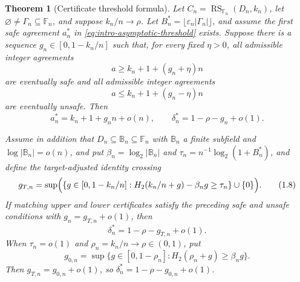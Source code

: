 \documentclass[11pt,a4paper]{amsart}
\numberwithin{equation}{section}
\newtheorem{theorem}{Theorem}[section]
\theoremstyle{remark}
\DeclareMathOperator{\RS}{RS}
\newcommand{\F}{\mathbb F}
\newcommand{\B}{\mathbb B}
\newcommand{\eps}{\varepsilon}
\begin{document}
\begin{theorem}[Certificate threshold formula]\label{thm:intro-delta-formula}
Let \(C_n=\RS_{\F_n}(D_n,k_n)\), let
\(\varnothing\ne\Gamma_n\subseteq\F_n\), and suppose \(k_n/n\to\rho\).
Let \(B_n^*=\lfloor\eps_n|\Gamma_n|\rfloor\), and assume the first safe
agreement \(a_n^*\) in \eqref{eq:intro-asymptotic-threshold} exists.
Suppose there is a sequence \(g_n\in[0,1-k_n/n]\) such that, for every
fixed \(\eta>0\), all admissible integer agreements
\[
 a\ge k_n+1+(g_n+\eta)n
\]
are eventually safe and all admissible integer agreements
\[
 a\le k_n+1+(g_n-\eta)n
\]
are eventually unsafe.  Then
\[
 a_n^*=k_n+1+g_n n+o(n),
 \qquad
 \delta_n^*=1-\rho-g_n+o(1).
 \tag{1.7}\label{eq:intro-delta-formula}
\]

Assume in addition that \(D_n\subseteq\B_n\subseteq\F_n\) with
\(\B_n\) a finite subfield and \(\log|\B_n|=o(n)\), and put
\(\beta_n=\log_2|\B_n|\) and
\(\tau_n=n^{-1}\log_2(1+B_n^*)\), and define the target-adjusted
identity crossing
\[
 g_{T,n}=\sup\Bigl(
 \{g\in[0,1-k_n/n]:
 H_2(k_n/n+g)-\beta_ng\ge\tau_n\}\cup\{0\}\Bigr).
 \tag{1.8}\label{eq:intro-target-crossing}
\]
If matching upper and lower certificates satisfy the preceding safe and
unsafe conditions with \(g_n=g_{T,n}+o(1)\), then
\[
 \delta_n^*=1-\rho-g_{T,n}+o(1).
 \tag{1.9}\label{eq:intro-identity-formula}
\]
When \(\tau_n=o(1)\) and \(\rho_n=k_n/n\to\rho\in(0,1)\), put
\[
 g_{0,n}=\sup\{g\in[0,1-\rho_n]:
 H_2(\rho_n+g)\ge\beta_ng\}.
 \tag{1.10}\label{eq:intro-zero-target-crossing}
\]
Then \(g_{T,n}=g_{0,n}+o(1)\), so
\(\delta_n^*=1-\rho-g_{0,n}+o(1)\).
\end{theorem}
\end{document}
